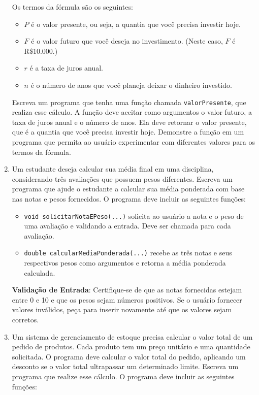 \documentclass[12pt]{article}
\begin{document}
\begin{enumerate}
          Os termos da fórmula são os seguintes:
          \begin{itemize}
              \item $P$ é o valor presente, ou seja, a quantia que você precisa investir hoje.
              \item $F$ é o valor futuro que você deseja no investimento. (Neste caso, $F$ é R\$10.000.)
              \item $r$ é a taxa de juros anual.
              \item $n$ é o número de anos que você planeja deixar o dinheiro investido.
          \end{itemize}

          Escreva um programa que tenha uma função chamada \texttt{valorPresente}, que realiza esse cálculo. A função deve aceitar como argumentos o valor futuro, a taxa de juros anual e o número de anos. Ela deve retornar o valor presente, que é a quantia que você precisa investir hoje. Demonstre a função em um programa que permita ao usuário experimentar com diferentes valores para os termos da fórmula.

    \item Um estudante deseja calcular sua média final em uma disciplina, considerando três avaliações que possuem pesos diferentes. Escreva um programa que ajude o estudante a calcular sua média ponderada com base nas notas e pesos fornecidos. O programa deve incluir as seguintes funções:
          \begin{itemize}

              \item \texttt{void solicitarNotaEPeso(...)} solicita ao usuário a nota e o peso de uma avaliação e validando a entrada. Deve ser chamada para cada avaliação.

              \item \texttt{double calcularMediaPonderada(...)} recebe as três notas e seus respectivos pesos como argumentos e retorna a média ponderada calculada.
          \end{itemize}

          \textbf{Validação de Entrada}: Certifique-se de que as notas fornecidas estejam entre 0 e 10 e que os pesos sejam números positivos. Se o usuário fornecer valores inválidos, peça para inserir novamente até que os valores sejam corretos.

    \item Um sistema de gerenciamento de estoque precisa calcular o valor total de um pedido de produtos. Cada produto tem um preço unitário e uma quantidade solicitada. O programa deve calcular o valor total do pedido, aplicando um desconto se o valor total ultrapassar um determinado limite. Escreva um programa que realize esse cálculo. O programa deve incluir as seguintes funções:
          \begin{itemize}


\end{itemize}
\end{enumerate}
\end{document}
